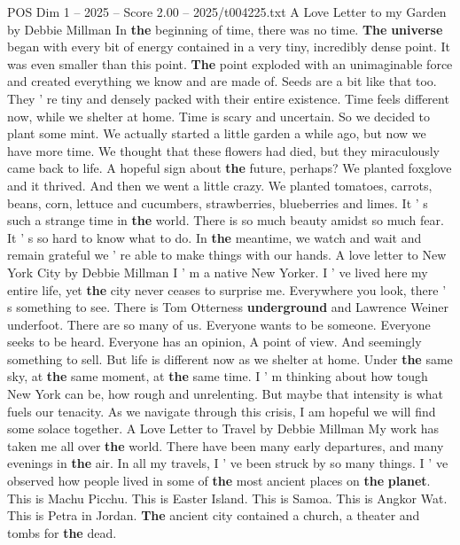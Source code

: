 \begin{textsample}{POS Dim 1 – 2025 – Score 2.00 – 2025/t004225.txt}  \label{ex:f1_pos_079}
A Love Letter to my Garden by Debbie Millman In \textbf{the} beginning of time, there was no time. \textbf{The} \textbf{universe} began with every bit of energy contained in a very tiny, incredibly dense point.
It was even smaller than this point. \textbf{The} point exploded with an unimaginable force and created everything we know and are made of.
Seeds are a bit like that too.
They ' re tiny and densely packed with their entire existence.
Time feels different now, while we shelter at home.
Time is scary and uncertain.
So we decided to plant some mint.
We actually started a little garden a while ago, but now we have more time.
We thought that these flowers had died, but they miraculously came back to life.
A hopeful sign about \textbf{the} future, perhaps?
We planted foxglove and it thrived.
And then we went a little crazy.
We planted tomatoes, carrots, beans, corn, lettuce and cucumbers, strawberries, blueberries and limes.
It ' s such a strange time in \textbf{the} world.
There is so much beauty amidst so much fear.
It ' s so hard to know what to do.
In \textbf{the} meantime, we watch and wait and remain grateful we ' re able to make things with our hands.
A love letter to New York City by Debbie Millman I ' m a native New Yorker.
I ' ve lived here my entire life, yet \textbf{the} city never ceases to surprise me.
Everywhere you look, there ' s something to see.
There is Tom Otterness \textbf{underground} and Lawrence Weiner underfoot.
There are so many of us.
Everyone wants to be someone.
Everyone seeks to be heard.
Everyone has an opinion, A point of view.
And seemingly something to sell.
But life is different now as we shelter at home.
Under \textbf{the} same sky, at \textbf{the} same moment, at \textbf{the} same time.
I ' m thinking about how tough New York can be, how rough and unrelenting.
But maybe that intensity is what fuels our tenacity.
As we navigate through this crisis, I am hopeful we will find some solace together.
A Love Letter to Travel by Debbie Millman My work has taken me all over \textbf{the} world.
There have been many early departures, and many evenings in \textbf{the} air.
In all my travels, I ' ve been struck by so many things.
I ' ve observed how people lived in some of \textbf{the} most ancient places on \textbf{the} \textbf{planet}.
This is Machu Picchu.
This is Easter Island.
This is Samoa.
This is Angkor Wat.
This is Petra in Jordan. \textbf{The} ancient city contained a church, a theater and tombs for \textbf{the} dead.

\end{textsample}
